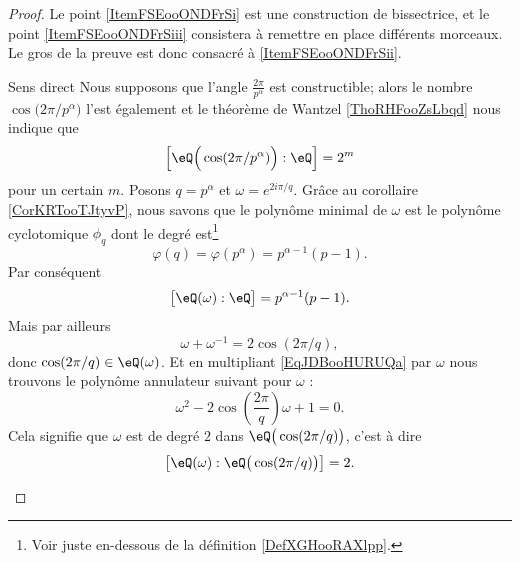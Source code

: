 \begin{proof}
    Le point \ref{ItemFSEooONDFrSi} est une construction de bissectrice, et le point \ref{ItemFSEooONDFrSiii} consistera à remettre en place différents morceaux. Le gros de la preuve est donc consacré à \ref{ItemFSEooONDFrSii}.
    \begin{subproof}
        \item[Sens direct]
            Nous supposons que l'angle \( \frac{ 2\pi }{ p^{\alpha} }\) est constructible; alors le nombre \( \cos\big( 2\pi/p^{\alpha} \big)\) l'est également et le théorème de Wantzel \ref{ThoRHFooZsLbqd} nous indique que
            \begin{equation}
                \left[ \eQ\Big( \cos(2\pi/p^{\alpha}) \Big):\eQ \right]=2^m
            \end{equation}
            pour un certain \( m\). Posons \( q=p^{\alpha}\) et \( \omega= e^{2i\pi/q}\). Grâce au corollaire \ref{CorKRTooTJtyvP}, nous savons que le polynôme minimal de \( \omega\) est le polynôme cyclotomique \( \phi_q\) dont le 
            degré est\footnote{Voir juste en-dessous de la définition \ref{DefXGHooRAXlpp}.}         %
            \begin{equation}
                \varphi(q)=\varphi(p^{\alpha})=p^{\alpha-1}(p-1).
            \end{equation}
            Par conséquent
            \begin{equation}    
                \big[ \eQ(\omega):\eQ \big]=p^{\alpha-1}(p-1).
            \end{equation}
            Mais par ailleurs
            \begin{equation}    \label{EqJDBooHURUQa}
                \omega+\omega^{-1}=2\cos(2\pi/q),
            \end{equation}
            donc \( \cos(2\pi/q)\in \eQ(\omega)\). Et en multipliant \eqref{EqJDBooHURUQa} par \( \omega\) nous trouvons le polynôme annulateur suivant pour \( \omega\) :
            \begin{equation}
                \omega^2-2\cos\left( \frac{ 2\pi }{ q } \right)\omega+1=0.
            \end{equation}
            Cela signifie que \( \omega\) est de degré \( 2\) dans \( \eQ\big( \cos(2\pi/q) \big)\), c'est à dire
            \begin{equation}    \label{EqSJXooRCLJyt}
                \big[ \eQ(\omega):\eQ\big( \cos(2\pi/q) \big) \big]=2.
            \end{equation}

\end{subproof}
\end{proof}

